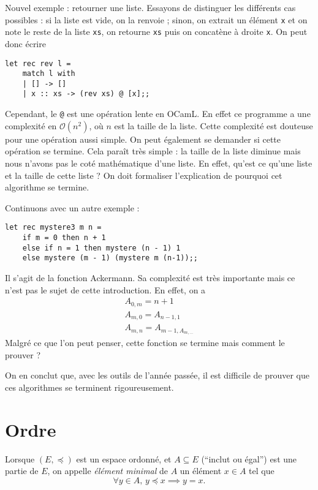 Nouvel exemple : retourner une liste. Essayons de distinguer les différents cas possibles : si la liste est vide, on la renvoie ; sinon, on extrait un élément {\tt x} et on note le reste de la liste {\tt xs}, on retourne {\tt xs} puis on concatène à droite {\tt x}. On peut donc écrire
\begin{lstlisting}[language=caml, caption=Inverser une liste]
let rec rev l =
	match l with
	| [] -> []
	| x :: xs -> (rev xs) @ [x];;
\end{lstlisting}
Cependant, le {\tt @} est une opération lente en OCamL. En effet ce programme a une complexité en $\mathcal{O}(n^2)$, où $n$\/ est la taille de la liste. Cette complexité est douteuse pour une opération aussi simple.
On peut également se demander si cette opération se termine.
Cela paraît très simple : la taille de la liste diminue mais nous n'avons pas le coté mathématique d'une liste. En effet, qu'est ce qu'une liste et la taille de cette liste ?
On doit formaliser l'explication de pourquoi cet algorithme se termine.

Continuons avec un autre exemple :
\begin{lstlisting}[language=caml, caption=Un programme mystère (3)]
let rec mystere3 m n =
	if m = 0 then n + 1
	else if n = 1 then mystere (n - 1) 1
	else mystere (m - 1) (mystere m (n-1));;
\end{lstlisting}
Il s'agit de la fonction {\sc Ackermann}. Sa complexité est très importante mais ce n'est pas le sujet de cette introduction. En effet, on a
\begin{gather*}
	A_{0,m} = n + 1\\
	A_{m,0} = A_{n-1, 1}\\
	A_{m,n} = A_{m-1,A_{m,\ldots}}
\end{gather*}
Malgré ce que l'on peut penser, cette fonction se termine mais comment le prouver ?


On en conclut que, avec les outils de l'année passée, il est difficile de prouver que ces algorithmes se terminent rigoureusement.

\section{Ordre}

\begin{defn} Lorsque $(E, \preceq)$\/ est un espace ordonné, et $A \subseteq E$\/ (``inclut ou égal'') est une partie de $E$, on appelle {\it élément minimal}\/ de $A$\/ un élément $x \in A$\/ tel que \[
	\forall y \in A,\,y \preceq x \implies y = x
.\]
\end{defn}

